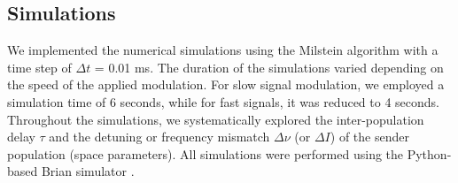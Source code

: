 \documentclass[../main.tex]{subfiles}
\begin{document}
\subsection{Simulations}
We implemented the numerical simulations using the Milstein algorithm \citep{milshtejn_approximate_1975} with a time step of $\Delta t$ = 0.01 ms.
The duration of the simulations varied depending on the speed of the applied modulation.
For slow signal modulation, we employed a simulation time of 6 seconds, while for fast signals, it was reduced to 4 seconds.
Throughout the simulations, we systematically explored the inter-population delay $\tau$ and the detuning or frequency mismatch $\Delta \nu$ (or $\Delta I$) of the sender population (space parameters).
All simulations were performed using the Python-based Brian simulator \citep{goodman2009brian}.
\end{document}
